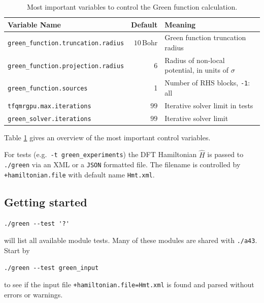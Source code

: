\documentclass[oribibl]{llncs}
\newcommand{\ttt}[1]{\texttt{#1}}
\begin{document}
%
\begin{table}[h]
\caption[Main Variables]{
Most important variables to control the Green function calculation.
} \label{tab:main-green-variables}
\centering
\begin{tabular}{|l|r|l|}
\hline
  Variable Name & Default & Meaning \\
\hline
  \ttt{green\_function.truncation.radius} & $10\,$Bohr   & Green function truncation radius \\
  \ttt{green\_function.projection.radius} & $6$          & Radius of non-local potential, in units of $\sigma$ \\
  \ttt{green\_function.sources}			  & 1            & Number of \ac{RHS} blocks, \ttt{-1}: all \\
  \ttt{tfqmrgpu.max.iterations}           & $99$         & Iterative solver limit in tests \\
  \ttt{green\_solver.iterations}          & $99$         & Iterative solver limit \\
\hline
\end{tabular}
\end{table}
%
\noindent
Table \ref{tab:main-green-variables} gives an overview of the most important control variables.

\noindent
For tests (e.g.~\ttt{-t green\_experiments})
the \ac{DFT} Hamiltonian $\hat H$ is passed to \ttt{./green} via an \ac{XML} or a \ttt{JSON} formatted file.
The filename is controlled by \ttt{+hamiltonian.file} with default name \ttt{Hmt.xml}.

\subsection{Getting started} \label{sec:green-getting-started}
%
\begin{verbatim}
./green --test '?'
\end{verbatim}
will list all available module tests. Many of these modules are shared with \ttt{./a43}.
Start by
\begin{verbatim}
./green --test green_input
\end{verbatim}
to see if the input file \ttt{+hamiltonian.file=Hmt.xml} is found and parsed without errors or warnings.
\end{document}
